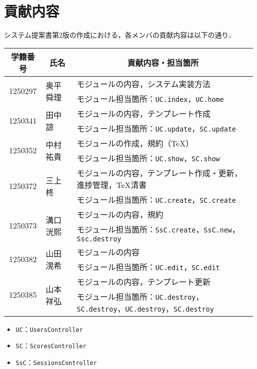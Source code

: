 \chapter{貢献内容}
システム提案書第2版の作成における，各メンバの貢献内容は以下の通り．
\begin{table}[h]
    \centering
    \begin{tabularx}{\textwidth}{cll}
        \multicolumn{1}{c}{学籍番号} & \multicolumn{1}{c}{氏名} & \multicolumn{1}{c}{貢献内容・担当箇所}\\
        \hline
        \multirow{2}{*}{1250297} & \multirow{2}{*}{奥平 舜理} & モジュールの内容，システム実装方法\\
                                 &                        & モジュール担当箇所：\texttt{UC.index}，\texttt{UC.home}\\
        \hline
        \multirow{2}{*}{1250341} & \multirow{2}{*}{田中 諒}  & モジュールの内容，テンプレート作成\\
                                 &                        & モジュール担当箇所：\texttt{UC.update}，\texttt{SC.update}\\
        \hline
        \multirow{2}{*}{1250352} & \multirow{2}{*}{中村 祐貴} &  モジュールの作成，規約（\TeX ）\\
                                 &                        & モジュール担当箇所：\texttt{UC.show}，\texttt{SC.show}\\
        \hline
        \multirow{2}{*}{1250372} & \multirow{2}{*}{三上 柊}  &  モジュールの内容，テンプレート作成・更新，進捗管理，\TeX 清書 \\
                                 &                        & モジュール担当箇所：\texttt{UC.create}，\texttt{SC.create}\\
        \hline
        \multirow{2}{*}{1250373} & \multirow{2}{*}{溝口 洸熙} & モジュールの内容，規約\\
                                 &                        & モジュール担当箇所：\texttt{SsC.create}，\texttt{SsC.new}，\texttt{Ssc.destroy}\\
        \hline
        \multirow{2}{*}{1250382} & \multirow{2}{*}{山田 滉希} & モジュールの内容\\
                                 &                        & モジュール担当箇所：\texttt{UC.edit}，\texttt{SC.edit}\\
        \hline
        \multirow{2}{*}{1250385} & \multirow{2}{*}{山本 祥弘} & モジュールの内容，テンプレート更新\\
                                 &                        & モジュール担当箇所：\texttt{UC.destroy}，\texttt{SC.destroy}，\texttt{UC.destroy}，\texttt{SC.destroy}\\
        \hline
    \end{tabularx}
\end{table}
\begin{itemize}
    \item \texttt{UC}：\texttt{UsersController}
    \item \texttt{SC}：\texttt{ScoresController}
    \item \texttt{SsC}：\texttt{SessionsController}
\end{itemize}